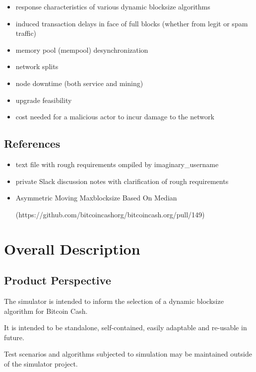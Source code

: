 \documentclass{scrreprt}
\begin{document}
    \begin{itemize}
      \item response characteristics of various dynamic blocksize algorithms
      \item induced transaction delays in face of full blocks (whether from
        legit or spam traffic)
      \item memory pool (mempool) desynchronization
      \item network splits
      \item node downtime (both service and mining)
      \item upgrade feasibility
      \item cost needed for a malicious actor to incur damage to the network
    \end{itemize}

  \section{References}

    \begin{itemize}
      \item text file with rough requirements ompiled by imaginary\_username
      \item private Slack discussion notes with clarification of rough
        requirements
      \item Asymmetric Moving Maxblocksize Based On Median

        (https://github.com/bitcoincashorg/bitcoincash.org/pull/149)
    \end{itemize}

\chapter{Overall Description}

  \section{Product Perspective}

    The simulator is intended to inform the selection of a dynamic blocksize
    algorithm for Bitcoin Cash.

    It is intended to be standalone, self-contained, easily adaptable and
    re-usable in future.

    Test scenarios and algorithms subjected to simulation may be maintained
    outside of the simulator project.
\end{document}
